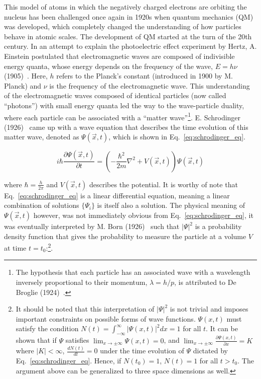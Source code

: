 This model of atoms in which the negatively charged electrons are orbiting the nucleus 
has been challenged once again in 1920s when quantum mechanics (QM) was developed, which completely 
changed the understanding of how particles behave in atomic scales. The development of QM started 
at the turn of the 20th century. In an attempt to explain the photoelectric effect experiment by Hertz,
A. Einstein postulated that electromagnetic waves are composed of indivisible energy quanta, whose energy depends on the
frequency of the wave, $E = h\nu$ (1905)~\cite{Einstein:1905cc}. 
Here, $h$ refers to the Planck's constant (introduced in 1900 by M. Planck) and $\nu$
is the frequency of the electromagnetic wave. This understanding of the electromagnetic waves composed of identical 
particles (now called ``photons'') with small energy quanta led the way to the wave-particle duality, 
where each particle can be associated with a 
``matter wave''\footnote{The hypothesis that each particle has an associated wave with a wavelength inversely
proportional to their momentum, $\lambda = h / p$, is attributed to De Broglie (1924)~\cite{deBroglie:1924ldk}.}. 
E. Schrodinger (1926)~\cite{Schrodinger:1926gei} 
came up with a wave equation that describes the time evolution of this matter wave, denoted as $\Psi(\vec{x}, t)$, 
which is shown in Eq.~\ref{eq:schrodinger_eq}.

\begin{equation}
    i\hbar\frac{\partial \Psi(\vec{x}, t)}{\partial t} = \left(- \frac{\hbar^2}{2m}\nabla^2 + V(\vec{x}, t) \right)\Psi(\vec{x}, t)
    \label{eq:schrodinger_eq}
\end{equation}

where $\hbar = \frac{h}{2\pi}$ and $V(\vec{x}, t)$ describes the potential. 
It is worthy of note that Eq.~\ref{eq:schrodinger_eq} is a linear differential equation,
meaning a linear combination of solutions $\{ \Psi_{i} \}$ is itself also a solution.
The physical meaning of $\Psi(\vec{x}, t)$ however,
was not immediately obvious from Eq.~\ref{eq:schrodinger_eq}, it was eventually interpreted by 
M. Born (1926)~\cite{Born:1926uzf}
such that $|\Psi|^2$ is a probability density function that gives the probability to measure the particle
at a volume $V$ at time 
$t=t_{0}$:\footnote{It should be noted that this interpretation of $|\Psi|^2$ is not trivial and imposes important constraints
on possible forms of wave functions. $\Psi(x,t)$ must satisfy the condition 
$N(t) = \int_{-\infty}^{\infty} |\Psi(x,t)|^{2} dx = 1$ for all $t$.
It can be shown that if $\Psi$ satisfies $\lim_{x \rightarrow \pm \infty} \Psi(x,t) = 0$, and
$\lim_{x \rightarrow \pm \infty} \frac{\partial \Psi(x,t)}{\partial x} = K$ where $|K| < \infty$,
$\frac{dN(t)}{dt} = 0$ under the time evolution of $\Psi$ dictated by Eq.~\ref{eq:schrodinger_eq}. 
Hence, if $N(t_0) = 1$, $N(t) = 1$ for all $t > t_0$. The argument above
can be generalized to three space dimensions as well.}.

